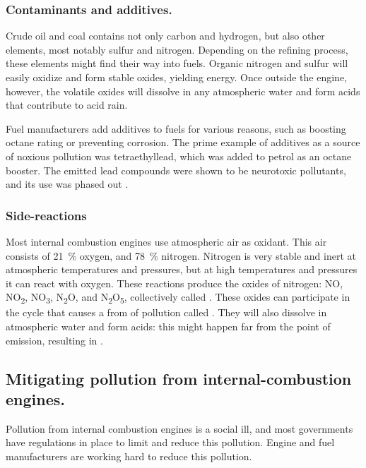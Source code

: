 \subsubsection{Contaminants and additives.}

Crude oil and coal contains not only carbon and hydrogen, but also other
elements, most notably sulfur and nitrogen. Depending on the refining process,
these elements might find their way into fuels. Organic nitrogen and sulfur will
easily oxidize and form stable oxides, yielding energy. Once outside the engine,
however, the volatile oxides will dissolve in any atmospheric water and form
acids \autocite{Duncan2016} that contribute to acid rain.

Fuel manufacturers add additives to fuels for various reasons, such as boosting
octane rating or preventing corrosion. The prime example of additives as a
source of noxious pollution was tetraethyllead, which was added to petrol as an
octane booster. The emitted lead compounds were shown to be neurotoxic
pollutants, and its use was phased out \autocite{Needleman2000}.

\subsubsection{Side-reactions}

Most internal combustion engines use atmospheric air as oxidant. This air
consists of \SI{21}{\percent} oxygen, and \SI{78}{\percent} nitrogen. Nitrogen
is very stable and inert at atmospheric temperatures and pressures, but at high
temperatures and pressures it can react with oxygen. These reactions produce the
oxides of nitrogen: NO, NO\textsubscript{2}, NO\textsubscript{3},
N\textsubscript{2}O, and N\textsubscript{2}O\textsubscript{5}, collectively
called \nox. These oxides can participate in the cycle that causes a from of
pollution called . They will also dissolve in
atmospheric water and form acids: this might happen far from the point of
emission, resulting in .

\subsection{Mitigating pollution from internal\hyp{}combustion engines.}
 
Pollution from internal combustion engines is a social ill, and most governments
have regulations in place to limit and reduce this pollution. Engine and fuel
manufacturers are working hard to reduce this pollution.

